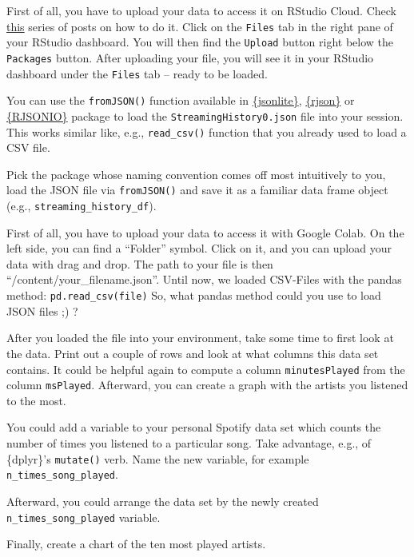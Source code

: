 \documentclass[
  11pt,
]{book}
\newenvironment{tips}[1]
  {
  \begin{itemize}
  \footnotesize
  \renewcommand{\labelitemi}{
    \raisebox{-.7\height}[0pt][0pt]{
      {\setkeys{Gin}{width=3em,keepaspectratio}
        \texttt{[image: images/\#1.png]}}
    }
  }
  \setlength{\fboxsep}{1em}
  \begin{rbox}
  \item
  }
  {
  \end{rbox}
  \end{itemize}
  }
\newenvironment{tipsp}[1]
  {
  \begin{itemize}
  \footnotesize
  \renewcommand{\labelitemi}{
    \raisebox{-.7\height}[0pt][0pt]{
      {\setkeys{Gin}{width=3em,keepaspectratio}
        \texttt{[image: images/\#1.png]}}
    }
  }
  \setlength{\fboxsep}{1em}
  \begin{pbox}
  \item
  }
  {
  \end{pbox}
  \end{itemize}
  }
\begin{document}
\begin{tips}r

First of all, you have to upload your data to access it on RStudio Cloud. Check \href{https://community.rstudio.com/t/importing-data-into-r-studio-cloud/14332/5}{this} series of posts on how to do it. Click on the \texttt{Files} tab in the right pane of your RStudio dashboard. You will then find the \texttt{Upload} button right below the \texttt{Packages} button. After uploading your file, you will see it in your RStudio dashboard under the \texttt{Files} tab -- ready to be loaded.

You can use the \texttt{fromJSON()} function available in \href{https://cran.r-project.org/package=jsonlite}{\{jsonlite\}}, \href{https://cran.r-project.org/package=rjson}{\{rjson\}} or \href{https://cran.r-project.org/package=RJSONIO}{\{RJSONIO\}} package to load the \texttt{StreamingHistory0.json} file into your session. This works similar like, e.g., \texttt{read\_csv()} function that you already used to load a CSV file.

Pick the package whose naming convention comes off most intuitively to you, load the JSON file via \texttt{fromJSON()} and save it as a familiar data frame object (e.g., \texttt{streaming\_history\_df}).

\end{tips}

\begin{tipsp}p

First of all, you have to upload your data to access it with Google Colab. On the left side, you can find a ``Folder'' symbol. Click on it, and you can upload your data with drag and drop. The path to your file is then ``/content/your\_filename.json''.
Until now, we loaded CSV-Files with the pandas method:
\texttt{pd.read\_csv(file)}
So, what pandas method could you use to load JSON files ;) ?

\end{tipsp}

After you loaded the file into your environment, take some time to first look at the data. Print out a couple of rows and look at what columns this data set contains. It could be helpful again to compute a column \texttt{minutesPlayed} from the column \texttt{msPlayed}.
Afterward, you can create a graph with the artists you listened to the most.

\begin{tips}r

You could add a variable to your personal Spotify data set which counts the number of times you listened to a particular song. Take advantage, e.g., of \{dplyr\}'s \texttt{mutate()} verb. Name the new variable, for example \texttt{n\_times\_song\_played}.

Afterward, you could arrange the data set by the newly created \texttt{n\_times\_song\_played} variable.

Finally, create a chart of the ten most played artists.

\end{tips}
\end{document}
